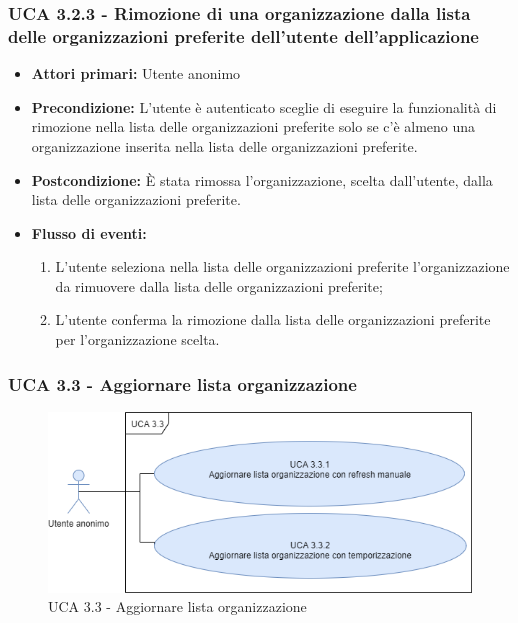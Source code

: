 \subsubsection{UCA 3.2.3 - Rimozione di una organizzazione dalla lista delle organizzazioni preferite dell'utente dell'applicazione}%
\begin{itemize}
	\item \textbf{Attori primari:} Utente anonimo
	\item \textbf{Precondizione:}  L'utente è autenticato sceglie di eseguire la funzionalità di rimozione nella lista delle organizzazioni preferite solo se c'è almeno una organizzazione inserita nella lista delle organizzazioni preferite.
	\item \textbf{Postcondizione:} È stata rimossa l'organizzazione, scelta dall'utente, dalla lista delle organizzazioni preferite.
	\item \textbf{Flusso di eventi:}
	\begin{enumerate}
		\item L'utente seleziona nella lista delle organizzazioni preferite l'organizzazione da rimuovere dalla lista delle organizzazioni preferite;
		\item L'utente conferma la rimozione dalla lista delle organizzazioni preferite per l'organizzazione scelta.
	\end{enumerate}
\end{itemize}



\subsubsection{UCA 3.3 - Aggiornare lista organizzazione}%

\begin{figure}[h]
	\centering
	\includegraphics[scale=0.5]{sezioni/UseCase/Immagini/UCA3.3.png}
	\caption{UCA 3.3 - Aggiornare lista organizzazione}
\end{figure}

